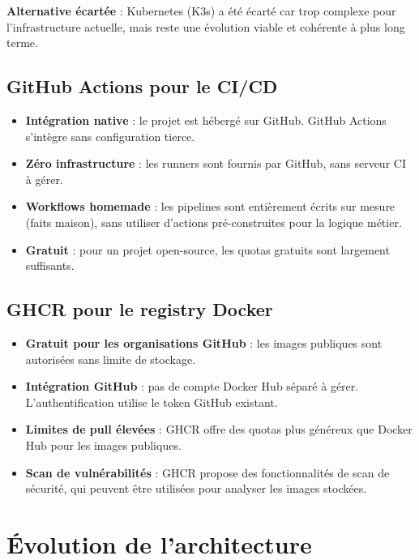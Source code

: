 \textbf{Alternative écartée} : Kubernetes (K3s) a été écarté car trop
complexe pour l'infrastructure actuelle, mais reste une évolution viable
et cohérente à plus long terme.

\subsection{GitHub Actions pour le CI/CD}

\begin{itemize}
  \item \textbf{Intégration native} : le projet est hébergé sur GitHub.
    GitHub Actions s'intègre sans configuration tierce.
  \item \textbf{Zéro infrastructure} : les runners sont fournis par GitHub,
    sans serveur CI à gérer.
  \item \textbf{Workflows homemade} : les pipelines sont entièrement
    écrits sur mesure (faits maison), sans utiliser d'actions
    pré-construites pour la logique métier.
  \item \textbf{Gratuit} : pour un projet open-source, les quotas gratuits
    sont largement suffisants.
\end{itemize}

\subsection{GHCR pour le registry Docker}

\begin{itemize}
  \item \textbf{Gratuit pour les organisations GitHub} : les images publiques
    sont autorisées sans limite de stockage.
  \item \textbf{Intégration GitHub} : pas de compte Docker Hub séparé à
    gérer. L'authentification utilise le token GitHub existant.
  \item \textbf{Limites de pull élevées} : GHCR offre des quotas plus
    généreux que Docker Hub pour les images publiques.
  \item \textbf{Scan de vulnérabilités} : GHCR propose des fonctionnalités
    de scan de sécurité, qui peuvent être utilisées pour analyser les
    images stockées.
\end{itemize}

\section{Évolution de l'architecture}

